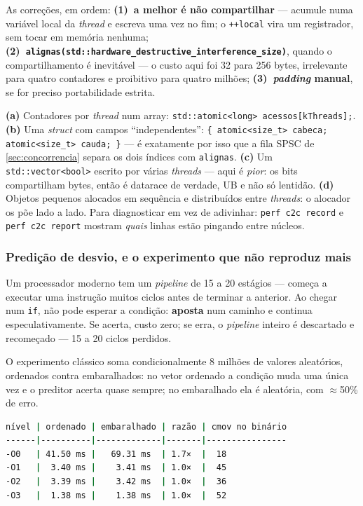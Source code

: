 As correções, em ordem: \textbf{(1)~a melhor é não compartilhar} --- acumule numa
variável local da \emph{thread} e escreva uma vez no fim; o \texttt{++local} vira
um registrador, sem tocar em memória nenhuma;
\textbf{(2)~\texttt{alignas(std::hardware\_destructive\_interference\_size)}},
quando o compartilhamento é inevitável --- o custo aqui foi 32 para 256 bytes,
irrelevante para quatro contadores e proibitivo para quatro milhões;
\textbf{(3)~\emph{padding} manual}, se for preciso portabilidade estrita.

\begin{armadilha}
\textbf{(a)} Contadores por \emph{thread} num array: \texttt{std::atomic<long>
acessos[kThreads];}.
\textbf{(b)} Uma \emph{struct} com campos ``independentes'':
\texttt{\{ atomic<size\_t> cabeca; atomic<size\_t> cauda; \}} --- é exatamente por
isso que a fila SPSC de \cref{sec:concorrencia} separa os dois índices com
\texttt{alignas}.
\textbf{(c)} Um \texttt{std::vector<bool>} escrito por várias \emph{threads} ---
aqui é \emph{pior}: os bits compartilham bytes, então é \gls{datarace} de verdade,
UB e não só lentidão.
\textbf{(d)} Objetos pequenos alocados em sequência e distribuídos entre
\emph{threads}: o alocador os põe lado a lado.
Para diagnosticar em vez de adivinhar: \texttt{perf c2c record} e \texttt{perf c2c
report} mostram \emph{quais} linhas estão pingando entre núcleos.
\end{armadilha}

\subsubsection{Predição de desvio, e o experimento que não reproduz mais}

Um processador moderno tem um \emph{pipeline} de 15 a 20 estágios --- começa a
executar uma instrução muitos ciclos antes de terminar a anterior. Ao chegar num
\texttt{if}, não pode esperar a condição: \textbf{aposta} num caminho e continua
especulativamente. Se acerta, custo zero; se erra, o \emph{pipeline} inteiro é
descartado e recomeçado --- 15 a 20 ciclos perdidos.

O experimento clássico soma condicionalmente 8 milhões de valores aleatórios,
ordenados contra embaralhados: no vetor ordenado a condição muda uma única vez e o
preditor acerta quase sempre; no embaralhado ela é aleatória, com $\approx$50\% de
erro.

\begin{lstlisting}[style=bt, language=bash,
    caption={Medido em \texttt{src/performance/}: \texttt{for (int x : v) if (x >=
             128) s += x;} em quatro níveis de otimização.}]
nível | ordenado | embaralhado | razão | cmov no binário
------|----------|-------------|-------|----------------
-O0   | 41.50 ms |   69.31 ms  | 1.7×  |  18
-O1   |  3.40 ms |    3.41 ms  | 1.0×  |  45
-O2   |  3.39 ms |    3.42 ms  | 1.0×  |  36
-O3   |  1.38 ms |    1.38 ms  | 1.0×  |  52
\end{lstlisting}

